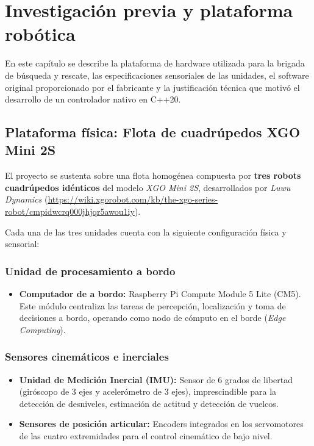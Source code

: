 \chapter{Investigación previa y plataforma robótica}
\label{chap:investigacion}

En este capítulo se describe la plataforma de hardware utilizada para la brigada de búsqueda y rescate, las especificaciones sensoriales de las unidades, el software original proporcionado por el fabricante y la justificación técnica que motivó el desarrollo de un controlador nativo en C++20.

\section{Plataforma física: Flota de cuadrúpedos XGO Mini 2S}
\label{sec:perros}

El proyecto se sustenta sobre una flota homogénea compuesta por \textbf{tres robots cuadrúpedos idénticos} del modelo \textit{XGO Mini 2S}, desarrollados por \textit{Luwu Dynamics} (\url{https://wiki.xgorobot.com/kb/the-xgo-series-robot/cmpidwcrq000jhjqr5awou1iy}). 

Cada una de las tres unidades cuenta con la siguiente configuración física y sensorial:

\subsection{Unidad de procesamiento a bordo}
\begin{itemize}
    \item \textbf{Computador de a bordo:} Raspberry Pi Compute Module 5 Lite (CM5). Este módulo centraliza las tareas de percepción, localización y toma de decisiones a bordo, operando como nodo de cómputo en el borde (\textit{Edge Computing}).
\end{itemize}

\subsection{Sensores cinemáticos e inerciales}
\begin{itemize}
    \item \textbf{Unidad de Medición Inercial (IMU):} Sensor de 6 grados de libertad (giróscopo de 3 ejes y acelerómetro de 3 ejes), imprescindible para la detección de desniveles, estimación de actitud y detección de vuelcos.
    \item \textbf{Sensores de posición articular:} Encoders integrados en los servomotores de las cuatro extremidades para el control cinemático de bajo nivel.
\end{itemize}

